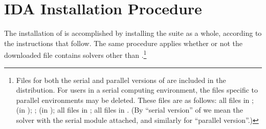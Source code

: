 \chapter{IDA Installation Procedure}\label{s:install}

The installation of {\ida} is accomplished by installing the
{\sundials} suite as a whole, according to the instructions that
follow.   The same procedure applies whether or not the downloaded
file contains solvers other than {\ida}.\footnote{Files for both the
serial and parallel versions of {\ida} are included in the distribution.
For users in a serial computing environment, the files specific to parallel
environments may be deleted.   These files are as follows:
all files in ;
 (in );
; 
 (in );
all files in ;
all files in .
(By ``serial version'' of {\ida} we mean the {\ida} solver with the
serial {\nvector} module attached, and similarly for ``parallel version''.)}

